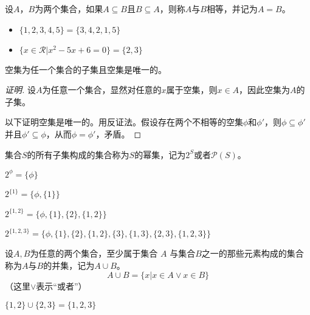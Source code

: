     \begin{Def}
    设$A$，$B$为两个集合，如果$A \subseteq B$且$B \subseteq A$，则称$A$与$B$相等，并记为$A=B$。
  \end{Def}
    \begin{itemize}
  \item   $\{1,2,3,4,5\} = \{3,4,2,1,5\}$
\item $\{x \in \mathcal{R} | x^2 -5x + 6 = 0\} = \{2,3\}$
  \end{itemize}
  \begin{Thm}
   空集为任一个集合的子集且空集是唯一的。 
  \end{Thm}
  \begin{proof}[证明]设$A$为任意一个集合，显然对任意的$x$属于空集，则$x\in A$，因此空集为$A$的子集。

以下证明空集是唯一的。用反证法。假设存在两个不相等的空集$\phi$和$\phi'$，则$\phi \subseteq \phi'$并且$\phi' \subseteq \phi$，从而$\phi = \phi'$，矛盾。  
    
  \end{proof}
\begin{Def}
  集合$S$的所有子集构成的集合称为$S$的幂集，记为$2^S$或者$\mathcal{P}(S)$。
\end{Def}
\begin{Example}
      $2^{\phi}=\{\phi\}$

    $2^{\{1\}}=\{\phi, \{1\}\}$

  $2^{\{1,2\}}=\{\phi, \{1\},\{2\},\{1,2\}\}$
  
  $2^{\{1,2,3\}}=\{\phi, \{1\},\{2\},\{1,2\},\{3\},\{1,3\},\{2,3\},\{1,2,3\}\}$
\end{Example}

{
\flushleft
\begin{minipage}{0.70\linewidth}
  \begin{Def}
    设$A,B$为任意的两个集合，至少属于集合 $A$ 与集合$B$之一的那些元素构成的集合称为$A$与$B$的并集，记为$A \cup B$。
  \begin{equation*}
      A\cup B = \{x|x \in A \lor x \in B\} 
    \end{equation*}
    （这里$\lor$表示“或者”）
  \end{Def}
\end{minipage}
\begin{minipage}{0.29\linewidth}
 \end{minipage}
}
\begin{Example}
  $\{1,2\} \cup \{2,3\} = \{1,2,3\}$
\end{Example}

